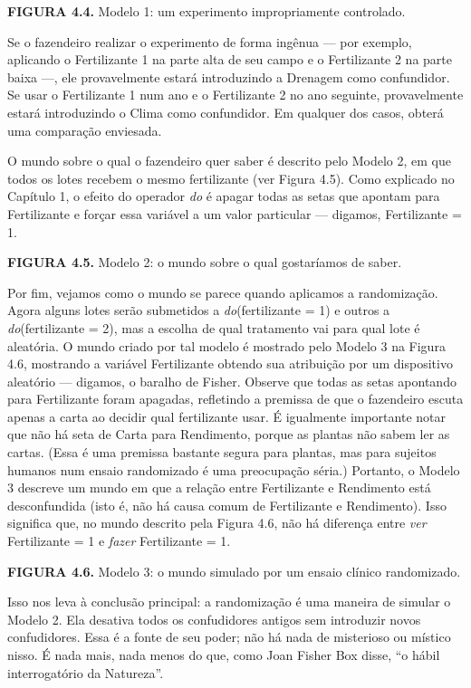 \documentclass[11pt,a5paper,twoside]{book}
\begin{document}
\textbf{FIGURA 4.4.} Modelo 1: um experimento impropriamente controlado.

Se o fazendeiro realizar o experimento de forma ingênua — por exemplo, aplicando o Fertilizante 1 na parte alta de seu campo e o Fertilizante 2 na parte baixa —, ele provavelmente estará introduzindo a Drenagem como confundidor. Se usar o Fertilizante 1 num ano e o Fertilizante 2 no ano seguinte, provavelmente estará introduzindo o Clima como confundidor. Em qualquer dos casos, obterá uma comparação enviesada.

O mundo sobre o qual o fazendeiro quer saber é descrito pelo Modelo 2, em que todos os lotes recebem o mesmo fertilizante (ver Figura 4.5). Como explicado no Capítulo 1, o efeito do operador \textit{do} é apagar todas as setas que apontam para Fertilizante e forçar essa variável a um valor particular — digamos, Fertilizante = 1.

\textbf{FIGURA 4.5.} Modelo 2: o mundo sobre o qual gostaríamos de saber.

Por fim, vejamos como o mundo se parece quando aplicamos a randomização. Agora alguns lotes serão submetidos a \textit{do}(fertilizante = 1) e outros a \textit{do}(fertilizante = 2), mas a escolha de qual tratamento vai para qual lote é aleatória. O mundo criado por tal modelo é mostrado pelo Modelo 3 na Figura 4.6, mostrando a variável Fertilizante obtendo sua atribuição por um dispositivo aleatório — digamos, o baralho de Fisher. Observe que todas as setas apontando para Fertilizante foram apagadas, refletindo a premissa de que o fazendeiro escuta apenas a carta ao decidir qual fertilizante usar. É igualmente importante notar que não há seta de Carta para Rendimento, porque as plantas não sabem ler as cartas. (Essa é uma premissa bastante segura para plantas, mas para sujeitos humanos num ensaio randomizado é uma preocupação séria.) Portanto, o Modelo 3 descreve um mundo em que a relação entre Fertilizante e Rendimento está desconfundida (isto é, não há causa comum de Fertilizante e Rendimento). Isso significa que, no mundo descrito pela Figura 4.6, não há diferença entre \textit{ver} Fertilizante = 1 e \textit{fazer} Fertilizante = 1.

\textbf{FIGURA 4.6.} Modelo 3: o mundo simulado por um ensaio clínico randomizado.

Isso nos leva à conclusão principal: a randomização é uma maneira de simular o Modelo 2. Ela desativa todos os confudidores antigos sem introduzir novos confudidores. Essa é a fonte de seu poder; não há nada de misterioso ou místico nisso. É nada mais, nada menos do que, como Joan Fisher Box disse, “o hábil interrogatório da Natureza”.
\end{document}
